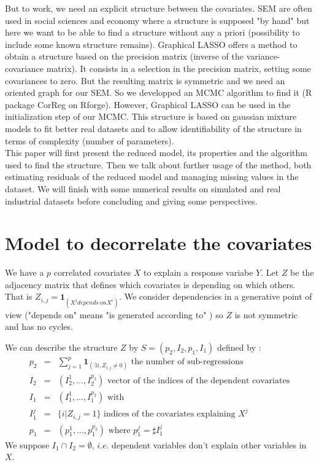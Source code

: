 \documentclass[11pt,a4paper]{article}
\begin{document}
But to work, we need an explicit structure between the covariates. SEM are often used in social sciences and economy where a structure is supposed "by hand" but here we want to be able to find a structure without any a priori (possibility to include some known structure remains). Graphical LASSO \cite{friedman2008sparse} offers a method to obtain a structure based on the precision matrix (inverse of the variance-covariance matrix). It consists in a selection in the precision matrix, setting some covariances to zero. But the resulting matrix is symmetric and we need an oriented graph for our SEM. So we developped an MCMC algorithm to find it (R package CorReg on Rforge). However, Graphical LASSO can be used in the initialization step of our MCMC. This structure is based on gaussian mixture models to fit better real datasets and to allow identifiability of the structure in terms of complexity (number of parameters).
 	\\
 	
 	This paper will first present the reduced model, its properties and the algorithm used to find the structure. Then we talk about further usage of the method, both estimating residuals of the reduced model and managing missing values in the dataset. 
 	We will finish with some numerical results on simulated and real industrial datasets before concluding and giving some perspectives.
	
\section{Model to decorrelate the covariates}


We have a $p$ correlated covariates $X$ to explain a response variabe $Y$.
Let $Z$ be the adjacency matrix that defines which covariates is depending on which others. That is $Z_{i,j}=\mathbf{1}_{(X^j depends\ on X^i)}$. We consider dependencies in a generative point of view ("depends on" means "is generated according to" ) so $Z$ is not symmetric and has no cycles. 
	
	We can describe the structure $Z$ by $S=(p_2,I_2,p_1,I_1)$ defined by :
	\begin{eqnarray}
		p_2&=& \sum_{j=1}^p\mathbf{1}_{(\exists i, Z_{i,j}\neq 0)} \textrm{ the number of sub-regressions}\\
		I_2&=&(I_2^1,\dots,I_2^{p_2}) \textrm{ vector of the indices of the dependent covariates}\\
		I_1&=&(I_1^1,\dots,I_1^{p_2}) \textrm{ with}		\\
		I_1^j &=& \{i |Z_{i,j}=1 \} \textrm{ indices of the covariates explaining $X^j$} \\
		p_1&=&(p_1^1,\dots,p_1^{p_2}) \textrm{ where }p_1^j=\sharp I_1^j 
	\end{eqnarray}
	We suppose $I_1\cap I_2=\emptyset$, $i.e.$ dependent variables don't explain other variables in $X$. 
	
\end{document}
